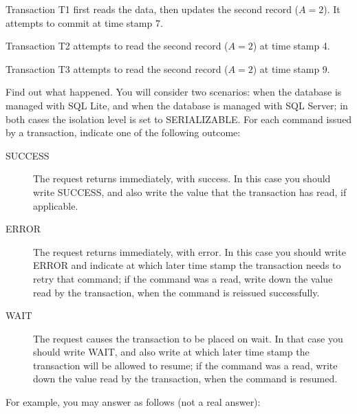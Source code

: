 \documentclass[addpoints,answers,12pt]{exam}
\begin{document}
\begin{questions}
\begin{parts}
Transaction T1 first reads the data, then updates the second record
($A=2$).  It attempts to commit at time stamp 7.

Transaction T2 attempts to read the second record ($A=2$) at time
stamp 4.

Transaction T3 attempts to read the second record ($A=2$) at time
stamp 9.

\newpage

\begin{subparts}
  \subpart Find out what happened.  You will consider two scenarios:
  when the database is managed with SQL Lite, and when the database is
  managed with SQL Server; in both cases the isolation level is set to
  SERIALIZABLE.  For each command issued by a transaction, indicate
  one of the following outcome:


\begin{description}
\item[SUCCESS] The request returns immediately, with success.  In this
  case you should write SUCCESS, and also write the value that the
  transaction has read, if applicable.
\item[ERROR] The request returns immediately, with error.  In this
  case you should write ERROR and indicate at which later time stamp
  the transaction needs to retry that command; if the command was a
  read, write down the value read by the transaction, when the command
  is reissued successfully.
\item[WAIT] The request causes the transaction to be placed on wait.
  In that case you should write WAIT, and also write at which later
  time stamp the transaction will be allowed to resume; if the command
  was a read, write down the value read by the transaction, when the
  command is resumed.
\end{description}

For example, you may answer as follows (not a real answer):

\vspace{2cm}


\end{subparts}
\end{parts}
\end{questions}
\end{document}
